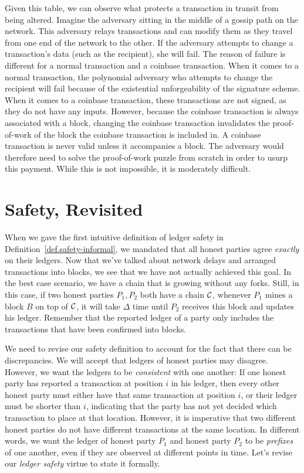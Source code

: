 Given this table, we can observe what protects a transaction in transit from being
altered. Imagine the adversary sitting in the middle of a gossip path on the network.
This adversary relays transactions and can modify them as they travel from one
end of the network to the other. If the adversary attempts to change a transaction's
data (such as the recipient), she will fail. The reason of failure is different for a
normal transaction and a coinbase transaction. When it comes to a normal transaction,
the polynomial adversary who attempts to change the recipient will fail because of the existential
unforgeability of the signature scheme. When it comes to a coinbase transaction,
these transactions are not signed, as they do not have any inputs. However, because
the coinbase transaction is always associated with a block, changing the coinbase
transaction invalidates the proof-of-work of the block the coinbase transaction is
included in. A coinbase transaction is never valid unless it accompanies a block.
The adversary would therefore need to solve the proof-of-work puzzle from scratch
in order to usurp this payment. While this is not impossible, it is moderately
difficult.

\section{Safety, Revisited}

When we gave the first intuitive definition of ledger safety in Definition~\ref{def.safety-informal}, we mandated that all honest parties
agree \emph{exactly} on their ledgers. Now that we've talked about network delays and arranged transactions into blocks, we see
that we have not actually achieved this goal. In the best case scenario, we have a chain that is growing without any forks. Still, in this
case, if two honest parties $P_1, P_2$ both have a chain $\mathcal{C}$, whenever $P_1$ mines a block $B$ on top of $\mathcal{C}$, it will take
$\Delta$ time until $P_2$ receives this block and updates his ledger. Remember that the reported ledger of a party only includes the
transactions that have been confirmed into blocks.

We need to revise our safety definition to account for the fact that there can be discrepancies. We will accept that ledgers of honest
parties may disagree. However, we want the ledgers to be \emph{consistent} with one another: If one honest party has reported a transaction
at position $i$ in his ledger, then every other honest party must either have that same transaction at position $i$, or their ledger
must be shorter than $i$, indicating that the party has not yet decided which transaction to place at that location. However, it is imperative
that two different honest parties do not have different transactions at the same location. In different words, we want the ledger of
honest party $P_1$ and honest party $P_2$ to be \emph{prefixes} of one another, even if they are observed at different points in time.
Let's revise our \emph{ledger safety} virtue to state it formally.

